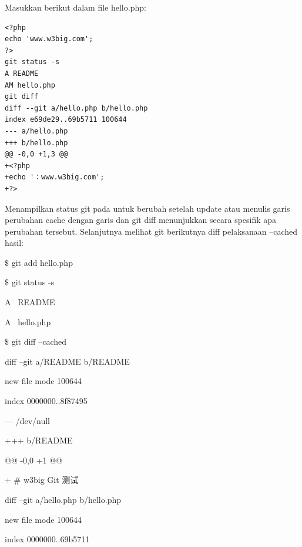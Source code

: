 \vspace{12pt}
\noindent 
Masukkan berikut dalam file hello.php:  \par
\begin{verbatim}
<?php
echo 'www.w3big.com';
?>
git status -s
A README
AM hello.php
git diff
diff --git a/hello.php b/hello.php
index e69de29..69b5711 100644
--- a/hello.php
+++ b/hello.php
@@ -0,0 +1,3 @@
+<?php
+echo '：www.w3big.com';
+?>
\end{verbatim}

\vspace{10pt}
\hspace*{0.5in}Menampilkan status git pada untuk berubah setelah update atau menulis garis perubahan cache dengan garis dan git diff menunjukkan secara spesifik apa perubahan tersebut.  Selanjutnya melihat git berikutnya diff pelaksanaan --cached hasil:  \par
\noindent 
{\fontsize{10pt}{10pt}\selectfont  $  \$  $ git add hello.php } \par
\noindent 
{\fontsize{10pt}{10pt}\selectfont  $  \$  $ git status -s} \par
\noindent 
{\fontsize{10pt}{10pt}\selectfont A~ README} \par
\noindent 
{\fontsize{10pt}{10pt}\selectfont A~ hello.php} \par
\noindent 
{\fontsize{10pt}{10pt}\selectfont  $  \$  $ git diff --cached} \par
\noindent 
{\fontsize{10pt}{10pt}\selectfont diff --git a/README b/README} \par
\noindent 
{\fontsize{10pt}{10pt}\selectfont new file mode 100644} \par
\noindent 
{\fontsize{10pt}{10pt}\selectfont index 0000000..8f87495} \par
\noindent 
{\fontsize{10pt}{10pt}\selectfont --- /dev/null} \par
\noindent 
{\fontsize{10pt}{10pt}\selectfont +++ b/README} \par
\noindent 
{\fontsize{10pt}{10pt}\selectfont @@ -0,0 +1 @@} \par
\noindent 
{\fontsize{10pt}{10pt}\selectfont + $  \#  $ w3big Git 测试} \par
\noindent 
{\fontsize{10pt}{10pt}\selectfont diff --git a/hello.php b/hello.php} \par
\noindent 
{\fontsize{10pt}{10pt}\selectfont new file mode 100644} \par
\noindent 
{\fontsize{10pt}{10pt}\selectfont index 0000000..69b5711} \par
